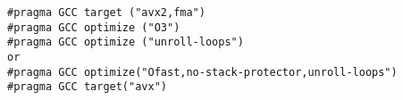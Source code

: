 \documentclass[E:/GsjzTle/main/main.tex]{subfiles}
\begin{document}
\begin{lstlisting}
#pragma GCC target ("avx2,fma")
#pragma GCC optimize ("O3")
#pragma GCC optimize ("unroll-loops")
or
#pragma GCC optimize("Ofast,no-stack-protector,unroll-loops")
#pragma GCC target("avx")
\end{lstlisting}
\end{document}
